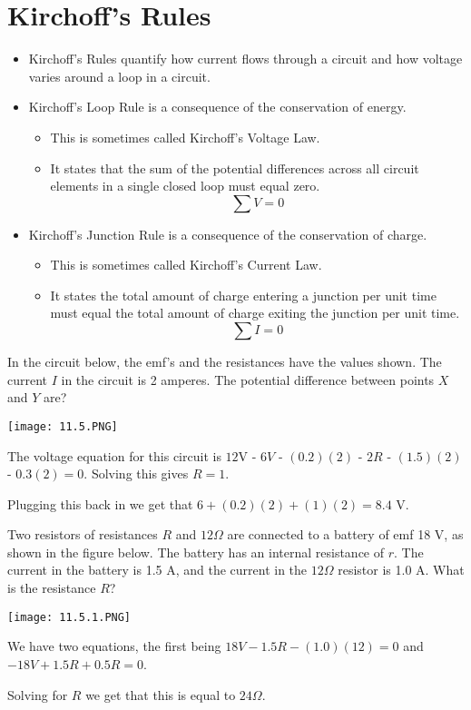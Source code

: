 \documentclass[../em.tex]{subfiles}
\begin{document}
\section{Kirchoff's Rules}
\begin{itemize}
    \item Kirchoff's Rules quantify how current flows through a circuit and how voltage varies around a loop in a circuit.
    \item Kirchoff's Loop Rule is a consequence of the conservation of energy.
    \begin{itemize}
        \item This is sometimes called Kirchoff's Voltage Law.
        \item It states that the sum of the potential differences across all circuit elements in a single closed loop must equal zero.
        \[\sum V = 0\]
    \end{itemize}
    \item Kirchoff's Junction Rule is a consequence of the conservation of charge.
    \begin{itemize}
        \item This is sometimes called Kirchoff's Current Law.
        \item It states the total amount of charge entering a junction per unit time must equal the total amount of charge exiting the junction per unit time.
        \[\sum I = 0\]
    \end{itemize}
\end{itemize}

\begin{example}
    In the circuit below, the emf's and the resistances have the values shown. The current $I$ in the circuit is 2 amperes. The potential difference between points $X$ and $Y$ are?

    \begin{center}
        \texttt{[image: 11.5.PNG]}
    \end{center}

    The voltage equation for this circuit is $12$V - $6V$ - $(0.2)(2)$ - $2R$ - $(1.5)(2)$ - $0.3(2) = 0$. Solving this gives $R=1$.

    Plugging this back in we get that $6+(0.2)(2)+(1)(2)=8.4$ V.
\end{example}

\begin{example}
    Two resistors of resistances $R$ and $12\Omega$ are connected to a battery of emf 18 V, as shown in the figure below. The battery has an internal resistance of $r$. The current in the battery 
    is 1.5 A, and the current in the $12\Omega$ resistor is 1.0 A. What is the resistance $R$?

    \begin{center}
        \texttt{[image: 11.5.1.PNG]}
    \end{center}

    We have two equations, the first being $18V-1.5R-(1.0)(12)=0$ and $-18V+1.5R+0.5R=0$.

    Solving for $R$ we get that this is equal to $24\Omega$.
\end{example}
\end{document}
